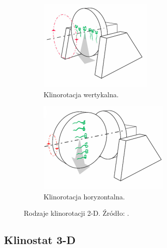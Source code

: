 \begin{figure}
	
	\centering
		\begin{subfigure}[b]{.49\textwidth}
		\centering
		\includegraphics[width=.7\textwidth]{klinorot_wert}
		\caption{Klinorotacja wertykalna.} 
		\label{fig:klinorot_wert}
	\end{subfigure}
	\hfill%
	\begin{subfigure}[b]{.49\textwidth}
		\centering
		\includegraphics[width=.7\textwidth]{klinorot_hor}
		\caption{Klinorotacja horyzontalna.} 
		\label{fig:klinorot_hor}
	\end{subfigure}

	\caption{Rodzaje klinorotacji 2-D. Źródło: \cite{bib:klinorotacja}.} 
	\label{fig:klinorotacje}
	
\end{figure}

\subsection{Klinostat 3-D} \label{klinostat3d}


